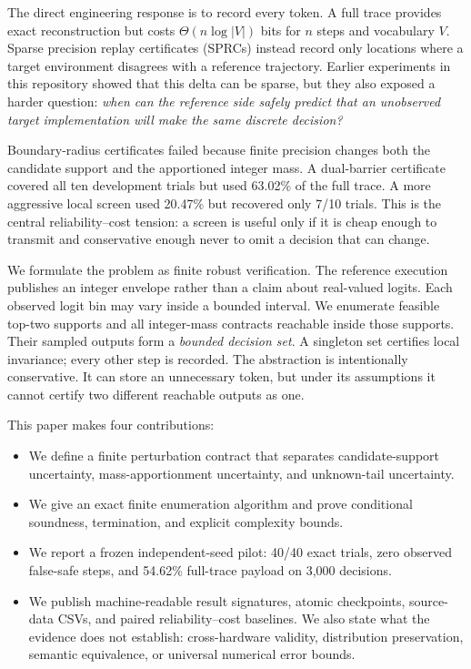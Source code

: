 \documentclass[sigconf,review,nonacm]{acmart}
\begin{document}
The direct engineering response is to record every token. A full trace provides exact reconstruction but costs $\Theta(n\log |V|)$ bits for $n$ steps and vocabulary $V$. Sparse precision replay certificates (SPRCs) instead record only locations where a target environment disagrees with a reference trajectory. Earlier experiments in this repository showed that this delta can be sparse, but they also exposed a harder question: \emph{when can the reference side safely predict that an unobserved target implementation will make the same discrete decision?}

Boundary-radius certificates failed because finite precision changes both the candidate support and the apportioned integer mass. A dual-barrier certificate covered all ten development trials but used 63.02\% of the full trace. A more aggressive local screen used 20.47\% but recovered only 7/10 trials. This is the central reliability--cost tension: a screen is useful only if it is cheap enough to transmit and conservative enough never to omit a decision that can change.

We formulate the problem as finite robust verification. The reference execution publishes an integer envelope rather than a claim about real-valued logits. Each observed logit bin may vary inside a bounded interval. We enumerate feasible top-two supports and all integer-mass contracts reachable inside those supports. Their sampled outputs form a \emph{bounded decision set}. A singleton set certifies local invariance; every other step is recorded. The abstraction is intentionally conservative. It can store an unnecessary token, but under its assumptions it cannot certify two different reachable outputs as one.

This paper makes four contributions:
\begin{itemize}[leftmargin=*]
  \item We define a finite perturbation contract that separates candidate-support uncertainty, mass-apportionment uncertainty, and unknown-tail uncertainty.
  \item We give an exact finite enumeration algorithm and prove conditional soundness, termination, and explicit complexity bounds.
  \item We report a frozen independent-seed pilot: 40/40 exact trials, zero observed false-safe steps, and 54.62\% full-trace payload on 3,000 decisions.
  \item We publish machine-readable result signatures, atomic checkpoints, source-data CSVs, and paired reliability--cost baselines. We also state what the evidence does not establish: cross-hardware validity, distribution preservation, semantic equivalence, or universal numerical error bounds.
\end{itemize}
\end{document}
